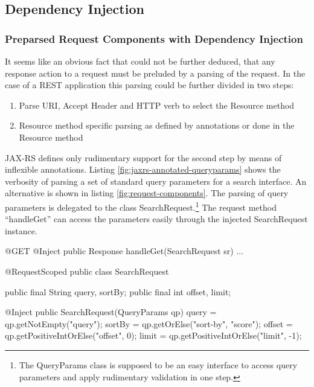 \documentclass[12pt,a4paper,twoside]{scrartcl}		%
\begin{document}
\subsection{Dependency Injection}
\label{sec:dependency-injection}

\subsubsection{Preparsed Request Components with Dependency Injection}
\label{sec:prep-requ-comp}

It seems like an obvious fact that could not be further deduced, that any
response action to a request must be preluded by a parsing of the request. In
the case of a REST application this parsing could be further divided in two
steps:
\begin{enumerate}
\item Parse URI, Accept Header and HTTP verb to select the Resource method
\item Resource method specific parsing as defined by annotations or done in the
  Resource method
\end{enumerate}

JAX-RS defines only rudimentary support for the second step by means of
inflexible annotations. Listing \ref{fig:jaxrs-annotated-queryparams} shows the
verbosity of parsing a set of standard query parameters for a search
interface. An alternative is shown in listing \ref{fig:request-components}. The
parsing of query parameters is delegated to the class
SearchRequest.\footnote{The QueryParams class is supposed to be an easy
  interface to access query parameters and apply rudimentary validation in one
  step.} The request method ``handleGet'' can access the parameters easily
through the injected SearchRequest instance.

\begin{javalisting}[label=fig:jaxrs-annotated-queryparams,
                   caption={Verbosity of parsing Requests with JAX-RS}]
@Get public Response get(
    @QueryParam("query") String query,
    @QueryParam("sort-by") String sortBy,
    @QueryParam("offset") int offset,
    @QueryParam("limit") int limit ) {
\end{javalisting}

\begin{javalisting}[label=fig:request-components,
                   caption={Separating Request parsing from the Resource method}]
@GET @Inject
public Response handleGet(SearchRequest sr) { ... }

@RequestScoped
public class SearchRequest {
    public final String query, sortBy;
    public final int offset, limit;
    
    @Inject public SearchRequest(QueryParams qp) {
        query = qp.getNotEmpty("query");
        sortBy = qp.getOrElse("sort-by", "score");
        offset = qp.getPositiveIntOrElse("offset", 0);
        limit = qp.getPositiveIntOrElse("limit", -1);
    }
}
\end{javalisting}
\end{document}
